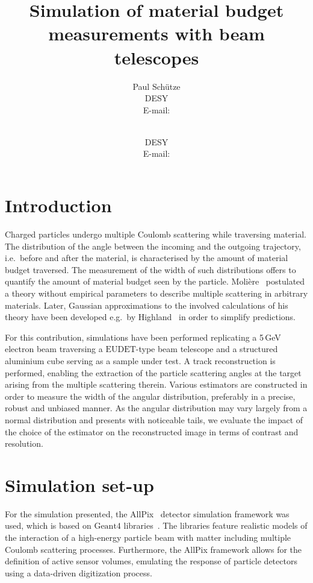 \documentclass{PoS}
\title{Simulation of material budget measurements with beam telescopes}
\author{Paul Sch\"utze\\
        DESY\\
        E-mail: \email{paul.schuetze@desy.de}}
\author{\speaker{Hendrik Jansen}\\
        DESY\\
        E-mail: \email{hendrik.jansen@desy.de}}
\newcommand{\eudet}{\ensuremath{\textrm{EUDET}}}
\newcommand{\Geant}{\ensuremath{\textrm{Geant4}}}
\begin{document}
\linenumbers
\section{Introduction}
Charged particles undergo multiple Coulomb scattering while traversing material. 
The distribution of the angle between the incoming and the outgoing trajectory, i.e.\ before and after the material, is characterised by the amount of material budget traversed. 
The measurement of the width of such distributions offers to quantify the amount of material budget seen by the particle. 
Moli\`ere~\cite{moliere} postulated a theory without empirical parameters to describe multiple scattering in arbitrary materials.
Later, Gaussian approximations to the involved calculations of his theory have been developed e.g.\ by Highland~\cite{ref:scatteringhighland} in order to simplify predictions.

For this contribution, simulations have been performed replicating a 5\,GeV electron beam traversing a $\eudet$-type beam telescope \cite{JansenEPJ} and a structured aluminium cube serving as a sample under test. 
A track reconstruction is performed, enabling the extraction of the particle scattering angles at the target arising from the multiple scattering therein.
Various estimators are constructed in order to measure the width of the angular distribution, preferably  in a precise, robust and unbiased manner. 
As the angular distribution may vary largely from a normal distribution and presents with noticeable tails,
 we evaluate the impact of the choice of the estimator on the reconstructed image in terms of contrast and resolution. 


\section{Simulation set-up}
For the simulation presented, the AllPix~\cite{ref:AllPix} detector simulation framework was used, which is based on $\Geant$ libraries~\cite{Agostinelli2003250,1610988}.
The libraries feature realistic models of the interaction of a high-energy particle beam with matter including multiple Coulomb scattering processes.
Furthermore, the AllPix framework allows for the definition of active sensor volumes, emulating the response of particle detectors using a data-driven digitization process. 
\end{document}
